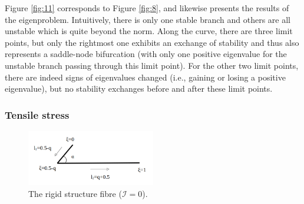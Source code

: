 \documentclass[lineno]{JFM-FLM_Au}
\begin{document}
Figure \ref{fig:11} corresponds to Figure \ref{fig:8}, and likewise presents the results of the eigenproblem. Intuitively, there is only one stable branch and others are all unstable which is quite beyond the norm. Along the curve, there are three limit points, but only the rightmost one exhibits an exchange of stability and thus also represents a saddle-node bifurcation (with only one positive eigenvalue for the unstable branch passing through this limit point). For the other two limit points, there are indeed signs of eigenvalues changed (i.e., gaining or losing a positive eigenvalue), but no stability exchanges before and after these limit points.


\subsubsection{Tensile stress}
\begin{figure}[!h]
	\begin{center}
		\includegraphics[width=0.5\textwidth]{plot/tensile_boomerang.png}
		\caption{The rigid structure fibre ($\mathcal{I}=0$).}
		\label{fig:16}
	\end{center}
\end{figure}
\end{document}
